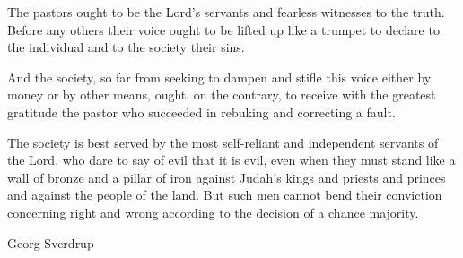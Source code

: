The pastors ought to be the Lord’s servants and fearless witnesses to the truth. Before any others their voice ought to be lifted up like a trumpet to declare to the individual and to the society their sins.

And the society, so far from seeking to dampen and stifle this voice either by money or by other means, ought, on the contrary, to receive with the greatest gratitude the pastor who succeeded in rebuking and correcting a fault.

The society is best served by the most self-reliant and independent servants of the Lord, who dare to say of evil that it is evil, even when they must stand like a wall of bronze and a pillar of iron against Judah’s kings and priests and princes and against the people of the land. But such men cannot bend their conviction concerning right and wrong according to the decision of a chance majority.

Georg Sverdrup
